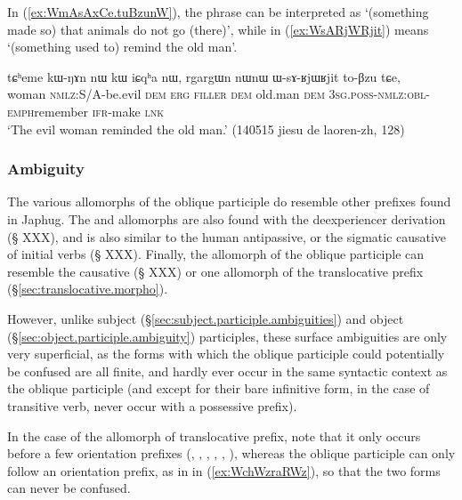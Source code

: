 In (\ref{ex:WmAsAxCe.tuBzunW}), the phrase  can be interpreted as `(something made so) that animals do not go (there)', while in (\ref{ex:WsARjWRjit})  means `(something used to) remind the old man'. 

\begin{exe}
\ex \label{ex:WsARjWRjit}
\gll tɕʰeme kɯ-ŋɤn nɯ kɯ iɕqʰa nɯ, rgargɯn nɯnɯ ɯ-sɤ-ʁjɯ\redp{}ʁjit to-βzu tɕe, \\
woman \textsc{nmlz}:S/A-be.evil \textsc{dem} \textsc{erg} \textsc{filler} \textsc{dem} old.man \textsc{dem} \textsc{3sg}.\textsc{poss}-\textsc{nmlz}:\textsc{obl}-\textsc{emph}\redp{}remember \textsc{ifr}-make \textsc{lnk} \\
\glt `The evil woman reminded the old man.' (140515 jiesu de laoren-zh, 128)
\end{exe}

\subsubsection{Ambiguity} \label{sec:oblique.participle.ambiguity}
The various allomorphs of the oblique participle do resemble other prefixes found in Japhug. The  and  allomorphs are also found with the deexperiencer derivation (§ XXX), and  is also similar to the human antipassive, or the sigmatic causative of  initial verbs (§ XXX). Finally, the  allomorph of the oblique participle can resemble the causative (§ XXX) or one allomorph of the translocative prefix (§\ref{sec:translocative.morpho}).

However, unlike subject (§\ref{sec:subject.participle.ambiguities}) and object (§\ref{sec:object.participle.ambiguity}) participles, these surface ambiguities are only very superficial, as the forms with which the oblique participle could potentially be confused are all finite, and hardly ever occur in the same syntactic context as the oblique participle (and except for their bare infinitive form, in the case of transitive verb, never occur with a possessive prefix). 

In the case of the  allomorph of translocative prefix, note that it only occurs before a few orientation prefixes (, , , , , ), whereas the oblique participle  can only follow an orientation prefix, as in  in (\ref{ex:WchWzraRWz}), so that the two forms can never be confused.

